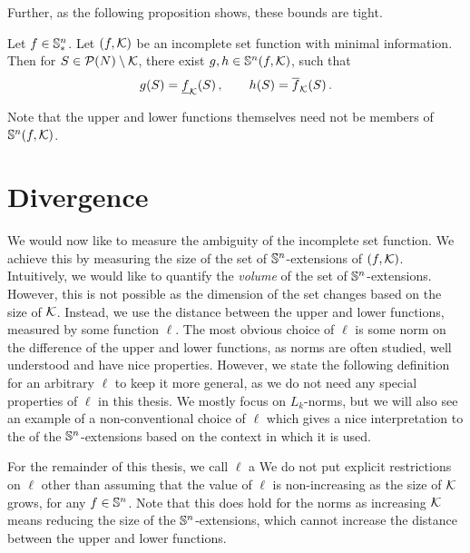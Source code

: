 Further, as the following proposition shows, these bounds are tight.

\begin{prop}
  Let $ f \in \mathbb{S}^n_* $.
  Let $ \left( f, \mathcal{K} \right) $ be an incomplete set function with minimal information.
  Then for $ S \in \mathcal{P}\!\left(N\right) \setminus \mathcal{K} $, there exist $ g,h \in \mathbb{S}^n\!\left(f, \mathcal{K}\right) $, such that \[
    g\!\left(S\right) = \underline{f}_{\mathcal{K}}\!\left(S\right), \qquad h\!\left(S\right) = \overline{f}_{\mathcal{K}}\!\left(S\right).
  \]
\end{prop}

Note that the upper and lower functions themselves need not be members of $ \mathbb{S}^n\!\left(f, \mathcal{K}\right) $.

\section{Divergence}
\label{sec:divergence}

We would now like to measure the ambiguity of the incomplete set function.
We achieve this by measuring the size of the set of $ \mathbb{S}^n $-extensions of $ \left( f, \mathcal{K} \right) $.
Intuitively, we would like to quantify the \emph{volume} of the set of $ \mathbb{S}^n $-extensions.
However, this is not possible as the dimension of the set changes based on the size of $ \mathcal{K}$.
Instead, we use the distance between the upper and lower functions, measured by some function $ \ell $.
The most obvious choice of $ \ell $ is some norm on the difference of the upper and lower functions, as norms are often studied, well understood and have nice properties.
However, we state the following definition for an arbitrary $ \ell $ to keep it more general, as we do not need any special properties of $ \ell $ in this thesis.
We mostly focus on $ L_k $-norms, but we will also see an example of a non-conventional choice of $ \ell $ which gives a nice interpretation to the  of the $ \mathbb{S}^n $-extensions based on the context in which it is used.

For the remainder of this thesis, we call $ \ell $ a 
We do not put explicit restrictions on $ \ell $ other than assuming that the value of $ \ell $ is non-increasing as the size of $ \mathcal{K} $ grows, for any $f \in \mathbb{S}^n$.
Note that this does hold for the norms as increasing $ \mathcal{K} $ means reducing the size of the $ \mathbb{S}^n $-extensions, which cannot increase the distance between the upper and lower functions.


